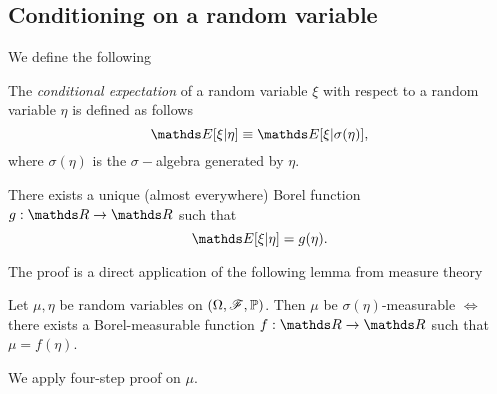 \subsection{Conditioning on a random variable}
We define the following
\begin{definition}
The \textit{conditional expectation} of a random variable $\xi$ with respect to a random variable $\eta$ is defined as follows
\begin{equation*}
    \E[\xi | \eta] \equiv \E[\xi | \sigma(\eta)],
\end{equation*}
where $\sigma(\eta)$ is the $\sigma-$algebra generated by $\eta$.
\end{definition}

\begin{theorem} \label{thm:rep_of_conditional_expectation}
There exists a unique (almost everywhere) Borel function $g: \R \to \R$ such that
\begin{equation}
    \E[\xi | \eta] = g(\eta).
\end{equation}
\end{theorem}

The proof is a direct application of the following lemma from measure theory

\begin{lemma}
Let $\mu, \eta$ be random variables on $(\Omega,\mathcal{F},\mathbb{P})$. Then $\mu$ be $\sigma(\eta)$-measurable $\iff$ there exists a Borel-measurable function $f: \R \to \R$ such that $\mu = f(\eta)$. 
\end{lemma}

\begin{hint}
We apply four-step proof on $\mu$.
\end{hint}

